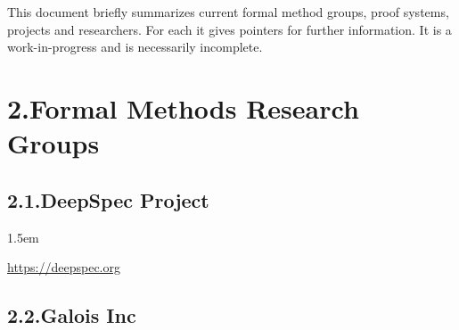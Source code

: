 \documentclass[12pt,twoside]{article}
\begin{document}
\noindent{}This document briefly summarizes current formal method groups, proof
systems, projects and researchers. For each it gives pointers for
further information. It is a work-in-progress and is necessarily
incomplete.%

\section{2.\hspace*{0.5em}Formal Methods Research Groups}\label{sec-formal-methods-research-groups}%

\subsection{2.1.\hspace*{0.5em}DeepSpec Project}\label{sec-deepspec-project}%

\begin{mddefinitions}%


\begin{mdbmarginx}{}{}{}{1.5em}%
\begin{mddefdata}%
\href{https://deepspec.org}{{\ttfamily https://\hspace{0pt}deepspec.\hspace{0pt}org}}%
\end{mddefdata}%
\end{mdbmarginx}%
\end{mddefinitions}%

\subsection{2.2.\hspace*{0.5em}Galois Inc}\label{sec-galois-inc}%
\end{document}
